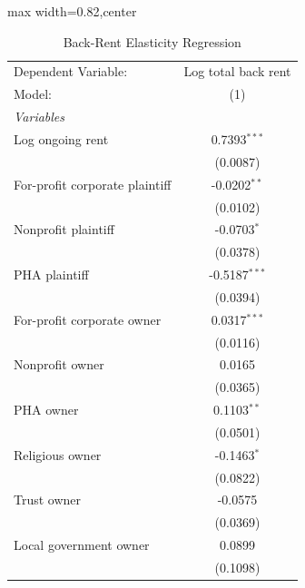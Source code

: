 
\begin{table}[htbp]
   \caption{\label{tab:backrent_rent} Back-Rent Elasticity Regression}
   \centering
   \scriptsize
   \begin{adjustbox}{max width=0.82\textwidth,center}
      \begin{tabular}{lc}
         \tabularnewline \midrule \midrule
         Dependent Variable:             & Log total back rent\\  
         Model:                          & (1)\\  
         \midrule
         \emph{Variables}\\
         Log ongoing rent                & 0.7393$^{***}$\\   
                                         & (0.0087)\\   
         For-profit corporate plaintiff  & -0.0202$^{**}$\\   
                                         & (0.0102)\\   
         Nonprofit plaintiff             & -0.0703$^{*}$\\   
                                         & (0.0378)\\   
         PHA plaintiff                   & -0.5187$^{***}$\\   
                                         & (0.0394)\\   
         For-profit corporate owner      & 0.0317$^{***}$\\   
                                         & (0.0116)\\   
         Nonprofit owner                 & 0.0165\\   
                                         & (0.0365)\\   
         PHA owner                       & 0.1103$^{**}$\\   
                                         & (0.0501)\\   
         Religious owner                 & -0.1463$^{*}$\\   
                                         & (0.0822)\\   
         Trust owner                     & -0.0575\\   
                                         & (0.0369)\\   
         Local government owner          & 0.0899\\   
                                         & (0.1098)\\   

\end{tabular}
\end{adjustbox}
\end{table}
